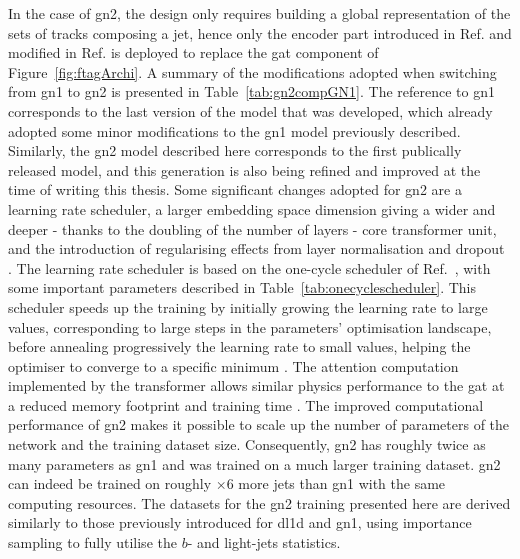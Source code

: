 In the case of \gls{gn2}, the design only requires building a global representation of the sets of tracks composing a jet, hence only the encoder part introduced in Ref. \cite{NIPS_transformerPaper} and modified in Ref. \cite{shleifer2021normformer} is deployed to replace the \gls{gat} component of Figure~\ref{fig:ftagArchi}. A summary of the modifications adopted when switching from \gls{gn1} to \gls{gn2} is presented in Table~\ref{tab:gn2compGN1}. The reference to \gls{gn1} corresponds to the last version of the model that was developed, which already adopted some minor modifications to the \gls{gn1} model previously described. Similarly, the \gls{gn2} model described here corresponds to the first publically released model, and this generation is also being refined and improved at the time of writing this thesis. Some significant changes adopted for \gls{gn2} are a learning rate scheduler, a larger embedding space dimension giving a wider and deeper - thanks to the doubling of the number of layers - core transformer unit, and the introduction of regularising effects from layer normalisation and dropout \cite{ba2016layer}. The learning rate scheduler is based on the one-cycle scheduler of Ref.~\cite{smith2018disciplined}, with some important parameters described in Table~\ref{tab:onecyclescheduler}. This scheduler speeds up the training by initially growing the learning rate to large values, corresponding to large steps in the parameters' optimisation landscape, before annealing progressively the learning rate to small values, helping the optimiser to converge to a specific minimum \cite{smith2018superconvergence}. The attention computation implemented by the transformer allows similar physics performance to the \gls{gat} at a reduced memory footprint and training time \cite{duperrin2023flavour}. The improved computational performance of \gls{gn2} makes it possible to scale up the number of parameters of the network and the training dataset size. Consequently, \gls{gn2} has roughly twice as many parameters as \gls{gn1} and was trained on a much larger training dataset. \gls{gn2} can indeed be trained on roughly $\times 6$ more jets than \gls{gn1} with the same computing resources. The datasets for the \gls{gn2} training presented here are derived similarly to those previously introduced for \gls{dl1d} and \gls{gn1}, using importance sampling to fully utilise the $b$- and light-jets statistics. 

